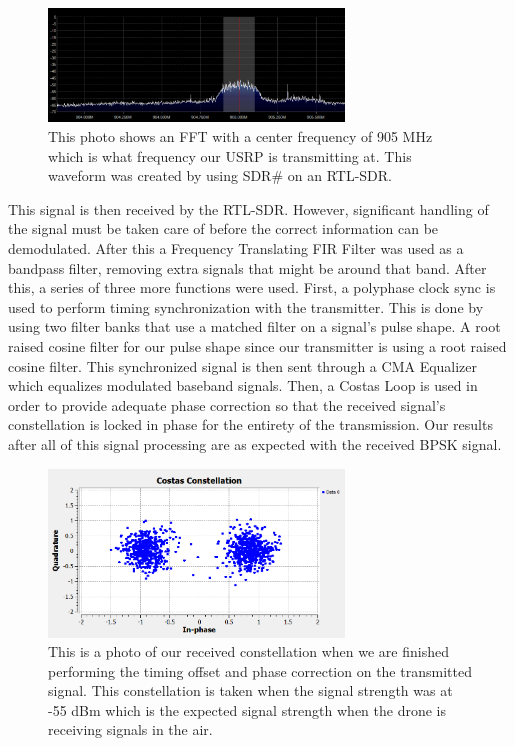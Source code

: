 \begin{figure}[h]
  \centering
  \includegraphics[width=0.70\textwidth]{img/rxspectrum.PNG}
  \caption{This photo shows an FFT with a center frequency of 905 MHz which is what frequency our USRP is transmitting at.  This waveform was created by using SDR\# on an RTL-SDR.}
  \label{fig:rxspectrum}
\end{figure}

This signal is then received by the RTL-SDR.  However, significant handling of the signal must be taken care of before the correct information can be demodulated. After this a Frequency Translating FIR Filter was used as a bandpass filter, removing extra signals that might be around that band. After this, a series of three more functions were used. First, a polyphase clock sync is used to perform timing synchronization with the transmitter. This is done by using two filter banks that use a matched filter on a signal’s pulse shape. A root raised cosine filter for our pulse shape since our transmitter is using a root raised cosine filter. This synchronized signal is then sent through a CMA Equalizer which equalizes modulated baseband signals. Then, a Costas Loop is used in order to provide adequate phase correction so that the received signal's constellation is locked in phase for the entirety of the transmission.  Our results after all of this signal processing are as expected with the received BPSK signal. 

\begin{figure}[h]
  \centering
  \includegraphics[width=0.70\textwidth]{img/constellation.PNG}
  \caption{This is a photo of our received constellation when we are finished performing the timing offset and phase correction on the transmitted signal.  This constellation is taken when the signal strength was at -55 dBm which is the expected signal strength when the drone is receiving signals in the air.}
  \label{fig:constellation}
\end{figure}

